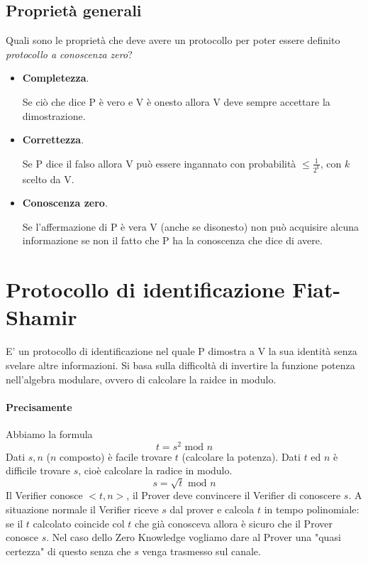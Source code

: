 \subsection{Proprietà generali}
Quali sono le proprietà che deve avere un protocollo per poter essere definito \emph{protocollo a conoscenza zero}?
\begin{itemize}
	\item \textbf{Completezza}. 
	
	Se ciò che dice P è vero e V è onesto allora V deve sempre accettare la dimostrazione.
	
	\item \textbf{Correttezza}.
	
	Se P dice il falso allora V può essere ingannato con probabilità $\leq \frac{1}{2^k}$, con $k$ scelto da V.
	
	\item \textbf{Conoscenza zero}.
	
	Se l'affermazione di P è vera V (anche se disonesto) non può acquisire alcuna informazione se non il fatto che P ha la conoscenza che dice di avere.
\end{itemize}

\section{Protocollo di identificazione Fiat-Shamir}
E' un protocollo di identificazione nel quale P dimostra a V la sua identità senza svelare altre informazioni. Si basa sulla difficoltà di invertire la funzione potenza nell'algebra modulare, ovvero di calcolare la raidce in modulo.
\paragraph{Precisamente} Abbiamo la formula 
$$t=s^2 \text{ mod } n$$
Dati $s,n$ ($n$ composto) è facile trovare $t$ (calcolare la potenza). Dati $t$ ed $n$ è difficile trovare $s$, cioè calcolare la radice in modulo.
$$s=\sqrt{t} \text{ mod }n$$
Il Verifier conosce $<t,n>$, il Prover deve convincere il Verifier di conoscere $s$. A situazione normale il Verifier riceve $s$ dal prover e calcola $t$ in tempo polinomiale: se il $t$ calcolato coincide col $t$ che già conosceva allora è sicuro che il Prover conosce $s$. Nel caso dello Zero Knowledge vogliamo dare al Prover una "quasi certezza" di questo senza che $s$ venga trasmesso sul canale. 

